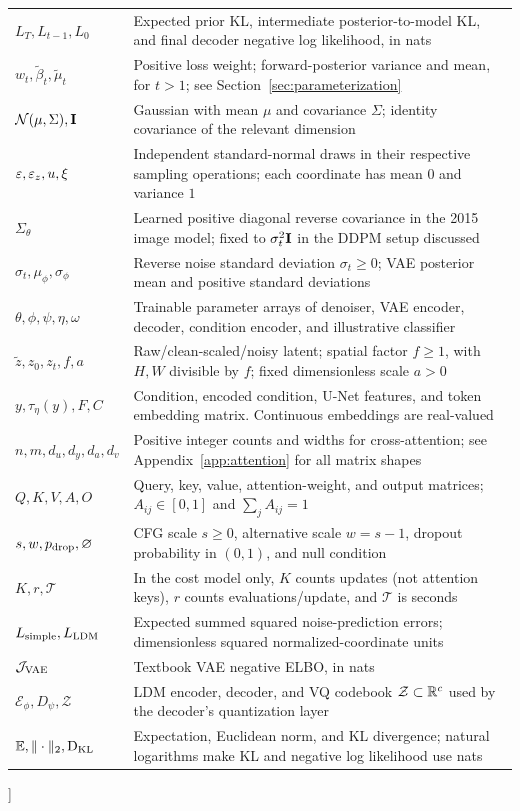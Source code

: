 {\begin{center}
\begin{minipage}{\textwidth}
\begin{tabularx}{\linewidth}{@{}p{3.3cm}Y@{}}
$L_T,L_{t-1},L_0$ & Expected prior KL, intermediate posterior-to-model KL,
and final decoder negative log likelihood, in nats\\
$w_t,\tilde\beta_t,\tilde\mu_t$ & Positive loss weight; forward-posterior
variance and mean, for $t>1$; see Section~\ref{sec:parameterization}\\
$\mathcal{N}(\mu,\Sigma),\mathbf{I}$ & Gaussian with mean $\mu$ and covariance $\Sigma$;
identity covariance of the relevant dimension\\
$\varepsilon,\varepsilon_z,u,\xi$ & Independent standard-normal draws in their respective
sampling operations; each coordinate has mean $0$ and variance $1$\\
$\Sigma_\theta$ & Learned positive diagonal reverse covariance in the
2015 image model; fixed to $\sigma_t^2\mathbf{I}$ in the DDPM setup discussed\\
$\sigma_t,\mu_\phi,\sigma_\phi$ & Reverse noise standard deviation
$\sigma_t\ge0$; VAE posterior mean and positive standard deviations\\
$\theta,\phi,\psi,\eta,\omega$ & Trainable parameter arrays of denoiser,
VAE encoder, decoder, condition encoder, and illustrative classifier\\
$\tilde z,z_0,z_t,f,a$ & Raw/clean-scaled/noisy latent;
spatial factor $f\ge1$, with $H,W$ divisible by $f$;
fixed dimensionless scale $a>0$\\
$y,\tau_\eta(y),F,C$ & Condition, encoded condition, U-Net features, and token
embedding matrix. Continuous embeddings are real-valued\\
$n,m,d_u,d_y,d_a,d_v$ & Positive integer counts and widths for cross-attention;
see Appendix~\ref{app:attention} for all matrix shapes\\
$Q,K,V,A,O$ & Query, key, value, attention-weight, and output matrices;
$A_{ij}\in[0,1]$ and $\sum_j A_{ij}=1$\\
$s,w,p_{\rm drop},\varnothing$ & CFG scale $s\ge0$, alternative scale $w=s-1$,
dropout probability in $(0,1)$, and null condition\\
$K,r,\mathcal T$ & In the cost model only, $K$ counts updates (not attention
keys), $r$ counts evaluations/update, and $\mathcal T$ is seconds\\
$L_{\rm simple},L_{\rm LDM}$ & Expected summed squared noise-prediction
errors; dimensionless squared normalized-coordinate units\\
$\mathcal J_{\rm VAE}$ & Textbook VAE negative ELBO, in nats\\
$\mathcal E_\phi,D_\psi,\mathcal Z$ & LDM encoder, decoder, and VQ codebook
$\mathcal Z\subset\mathbb{R}^c$ used by the decoder's quantization layer\\
$\mathbb{E},\|\cdot\|_2,\operatorname{D_{KL}}$ & Expectation, Euclidean norm, and KL divergence;
natural logarithms make KL and negative log likelihood use nats\\
\bottomrule
\end{tabularx}
\end{minipage}
\end{center}
\vspace{8pt}
}]


